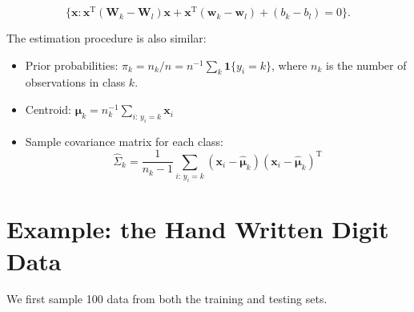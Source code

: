 \documentclass[
]{book}
\providecommand{\tightlist}{%
  \setlength{\itemsep}{0pt}\setlength{\parskip}{0pt}}
\theoremstyle{definition}
\theoremstyle{definition}
\theoremstyle{definition}
\theoremstyle{definition}
\theoremstyle{remark}
\begin{document}
\[\big\{\mathbf{x}: \mathbf{x}^\text{T}(\mathbf{W}_k - \mathbf{W}_l) \mathbf{x}+ \mathbf{x}^\text{T}(\mathbf{w}_k - \mathbf{w}_l) + (b_k - b_l) = 0\big\}.\]

The estimation procedure is also similar:

\begin{itemize}
\tightlist
\item
  Prior probabilities: \(\widehat{\pi}_k = n_k / n = n^{-1} \sum_k \mathbf{1}\{y_i = k\}\), where \(n_k\) is the number of observations in class \(k\).
\item
  Centroid: \(\widehat{\boldsymbol \mu}_k = n_k^{-1} \sum_{i: \,y_i = k} \mathbf{x}_i\)
\item
  Sample covariance matrix for each class:
  \[\widehat \Sigma_k = \frac{1}{n_k-1} \sum_{i : \, y_i = k} (\mathbf{x}_i - \widehat{\boldsymbol \mu}_k)(\mathbf{x}_i - \widehat{\boldsymbol \mu}_k)^\text{T}\]
\end{itemize}

\hypertarget{example-the-hand-written-digit-data}{%
\section{Example: the Hand Written Digit Data}\label{example-the-hand-written-digit-data}}

We first sample 100 data from both the training and testing sets.
\end{document}
